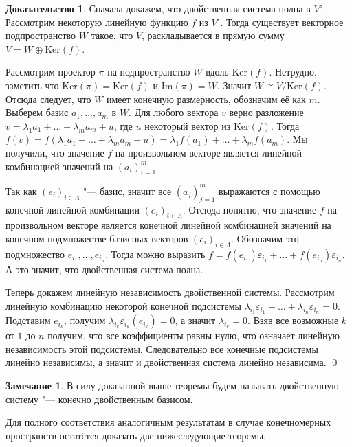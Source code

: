 \documentclass[a4paper, 12pt]{article}
\theoremstyle{definition}
\newtheorem*{prof}{\hspace*{\parindent}Доказательство}
\newtheorem*{remark}{Замечание}
\begin{document}
\begin{prof}
    
    Сначала докажем, что двойственная система полна в $V^\circ$. Рассмотрим некоторую линейную функцию $f$ из $V^\circ$.
    Тогда существует векторное подпространство $W$ такое, что $V$, раскладывается в прямую сумму ${V = W \oplus \mathrm{Ker} (f)}$.

    Рассмотрим проектор $\pi$ на подпространство $W$ вдоль $\mathrm{Ker}(f)$. Нетрудно, заметить что $\mathrm{Ker}(\pi) = \mathrm{Ker}(f)$ и $\mathrm{Im}(\pi) = W$. Значит $W \cong V/\mathrm{Ker}(f)$.
    Отсюда следует, что $W$ имеет конечную размерность, обозначим её как $m$. Выберем базис $a_1, \dots, a_m$ в $W$.
    Для любого вектора $v$ верно разложение $v = \lambda_1a_1+ \dots +\lambda_ma_m + u$, где $u$ некоторый вектор из $\mathrm{Ker}(f)$. Тогда $f(v) =  f(\lambda_1a_1+ \dots +\lambda_ma_m + u) = \lambda_1f(a_1)+ \dots +\lambda_mf(a_m)$. 
    Мы получили, что значение $f$ на произвольном векторе является линейной комбинацией значений на $(a_i)_{i = 1}^m$

    Так как $(e_i)_{i \in \Lambda}$ "--- базис, значит все $(a_j)_{j = 1}^m$ выражаются с помощью конечной линейной комбинации $(e_i)_{i \in \Lambda}$.
    Отсюда понятно, что значение $f$ на произвольном векторе является конечной линейной комбинацией значений на конечном подмножестве базисных векторов $(e_i)_{i \in \Lambda}$. Обозначим это подмножество $e_{i_1}, \dots, e_{i_n}$.
    Тогда можно выразить $f = f(e_{i_1})\varepsilon_{i_1} + \dots + f(e_{i_n})\varepsilon_{i_n}$.
    А это значит, что двойственная система полна.

    Теперь докажем линейную независимость двойственной системы. Рассмотрим линейную комбинацию некоторой конечной подсистемы $\lambda_{i_1}\varepsilon_{i_1} + \dots + \lambda_{i_n}\varepsilon_{i_n} = 0$. Подставим $e_{i_k}$, получим $\lambda_{i_k}\varepsilon_{i_k}(e_{i_k}) = 0$, а значит $\lambda_{i_k} = 0$. 
    Взяв все возможные $k$ от $1$ до $n$ получим, что все коэффициенты равны нулю, что означает линейную независимость этой подсистемы. Следовательно все конечные подсистемы линейно независимы, а значит и двойственная система линейно независима. \qed

\end{prof}

\begin{remark}
    В силу доказанной выше теоремы будем называть двойственную систему "--- конечно двойственным базисом.
\end{remark}
Для полного соответствия аналогичным результатам в случае конечномерных пространств остатётся доказать две нижеследующие теоремы.
\end{document}
